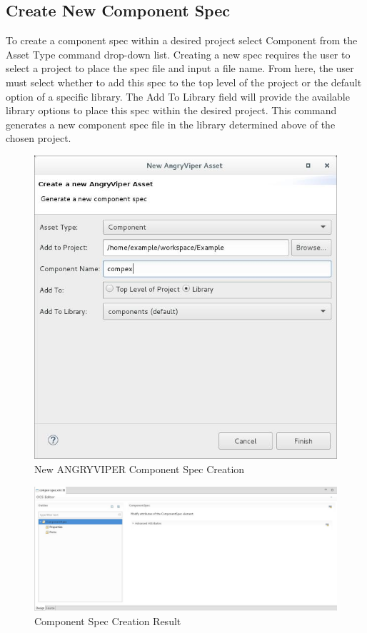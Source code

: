\subsection{Create New Component Spec}
\label{sec:create_spec}
\begin{flushleft}

To create a component spec within a desired project select Component from the Asset Type command drop-down list. Creating a new spec requires the user to select a project to place the spec file and input a file name. From here, the user must select whether to add this spec to the top level of the project or the default option of a specific library. The Add To Library field will provide the available library options to place this spec within the desired project. This command generates a new component spec file in the library determined above of the chosen project.\newline
\begin{figure}[h!]
  \centering
  \includegraphics[scale=0.45]{figures/createspec.jpg}
  \caption{New ANGRYVIPER Component Spec Creation}
  \label{fig:figure6}
\end{figure}

\begin{figure}[h!]
  \centering
  \includegraphics[scale=0.31]{figures/specresult.jpg}
  \caption{Component Spec Creation Result}
  \label{fig:figure7}
\end{figure}

\end{flushleft}

